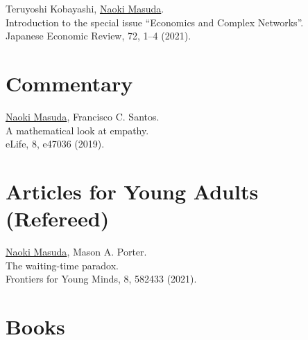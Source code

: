 \documentclass[11pt,letter]{article}
\begin{document}
\begin{etaremune}

\item Teruyoshi Kobayashi, \underline{Naoki Masuda}.\\
Introduction to the special issue ``Economics and Complex Networks''.\\
Japanese Economic Review, 72, 1--4 (2021).

\end{etaremune}

\section*{\bf \normalsize Commentary}

\begin{etaremune}

\item \underline{Naoki Masuda}, Francisco C. Santos.\\
A mathematical look at empathy.\\
eLife, 8, e47036 (2019).

\end{etaremune}

\section*{\bf\normalsize Articles for Young Adults (Refereed)}
 
\begin{etaremune}

\item \underline{Naoki Masuda}, Mason A. Porter.\\
The waiting-time paradox.\\
Frontiers for Young Minds, 8, 582433 (2021).

\end{etaremune}

\section*{\bf \normalsize Books}
\end{document}
